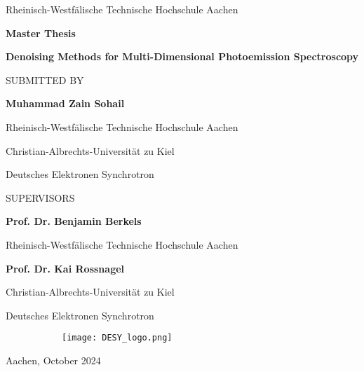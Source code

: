 \begin{titlepage}
    \begin{center}
        Rheinisch-Westfälische Technische Hochschule Aachen
        \vspace{0.2cm}
        
        \Large
        \textbf{Master Thesis}
            
        \vspace{0.5cm}
        \Large
        \textbf{Denoising Methods for Multi-Dimensional Photoemission Spectroscopy}
        
        \normalsize   
        \vspace{1cm}
        SUBMITTED BY
        \vspace{0.3cm} 
        
        \large
        \textbf{Muhammad Zain Sohail}
        
        \normalsize
        Rheinisch-Westfälische Technische Hochschule Aachen
        
        Christian-Albrechts-Universität zu Kiel
        
        Deutsches Elektronen Synchrotron
        
        \normalsize
        \vspace{1cm}         
        SUPERVISORS
        
        \large
        \vspace{0.3cm}

        \textbf{Prof. Dr. Benjamin Berkels }
        
        \normalsize
        Rheinisch-Westfälische Technische Hochschule Aachen
        
        
        \vspace{0.3cm}
        \large 
        \textbf{Prof. Dr. Kai Rossnagel}
        
        \normalsize
        Christian-Albrechts-Universität zu Kiel

        Deutsches Elektronen Synchrotron
            
        \vfill
            
        \begin{figure}[h]
            \begin{subfigure}{0.25\textwidth}
                \texttt{[image: DESY\_logo.png]}
            \end{subfigure}
        \end{figure}
        
        \vspace{0.3cm}
        Aachen, October 2024
            
    \end{center}
\end{titlepage}